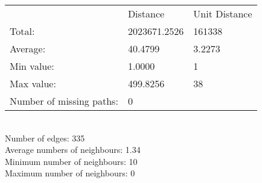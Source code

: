 \begin{tabular}{lll}
 & Distance & Unit Distance\\
Total: & 2023671.2526 & 161338\\
Average: & 40.4799 & 3.2273\\
Min value: & 1.0000 & 1\\
Max value: & 499.8256 & 38\\
\hline
Number of missing paths: & 0 &\\
\end{tabular}\\
Number of edges: 335\\
Average numbers of neighbours: 1.34\\
Minimum number of neighbours: 10\\
Maximum number of neighbours: 0\\

